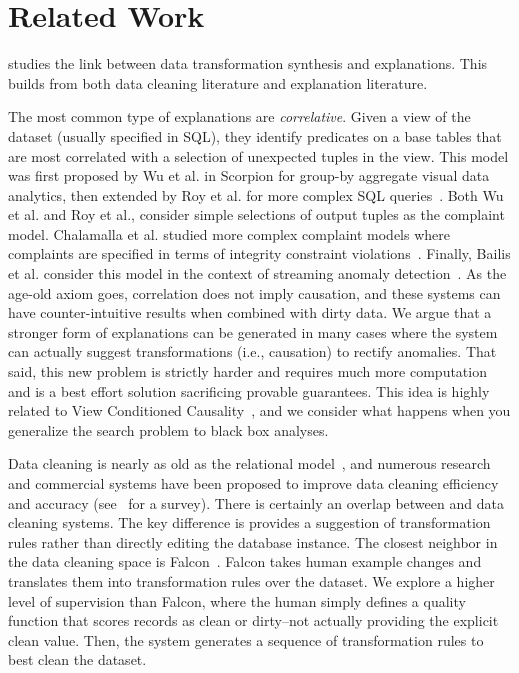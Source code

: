 \section{Related Work}
\sys studies the link between data transformation synthesis and explanations. This builds from both data cleaning literature and explanation literature.

The most common type of explanations are \emph{correlative}. Given a view of the dataset (usually specified in SQL), they  identify predicates on a base tables that are most correlated with a selection of unexpected tuples in the view. This model was first proposed by Wu et al. in Scorpion for group-by aggregate visual data analytics, then extended by Roy et al. for more complex SQL queries~\cite{roy2015explaining}. Both Wu et al. and Roy et al., consider simple selections of output tuples as the complaint model. Chalamalla et al. studied more complex complaint models where complaints are specified in terms of integrity constraint violations~\cite{DBLP:conf/sigmod/ChalamallaIOP14}.
Finally, Bailis et al. consider this model in the context of streaming anomaly detection~\cite{bailis2016macrobase}. As the age-old axiom goes, correlation does not imply causation, and these systems can have counter-intuitive results when combined with dirty data. We argue that a stronger form of explanations can be generated in many cases where the system can actually suggest transformations (i.e., causation) to rectify anomalies. That said, this new problem is strictly harder and requires much more computation and is a best effort solution sacrificing provable guarantees.
This idea is highly related to View Conditioned Causality~\cite{meliou2011tracing}, and we consider what happens when you generalize the search problem to black box analyses.

Data cleaning is nearly as old as the relational model~\cite{codd1970relational}, and numerous research and  commercial systems have been proposed to improve data cleaning efficiency and accuracy (see~\cite{rahm2000data} for a survey). 
There is certainly an overlap between \sys and data cleaning systems.
The key difference is \sys provides a suggestion of transformation rules rather than directly editing the database instance.
The closest neighbor in the data cleaning space is Falcon~\cite{he2016interactive}.
Falcon takes human example changes and translates them into transformation rules over the dataset.
We explore a higher level of supervision than Falcon, where the human simply defines a quality function that scores records as clean or dirty--not actually providing the explicit clean value.
Then, the system generates a sequence of transformation rules to best clean the dataset.

